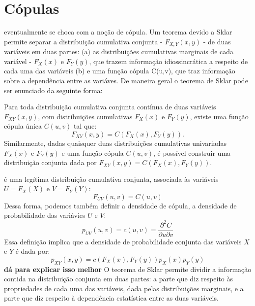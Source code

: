\section{Cópulas}
 eventualmente se choca com a noção de cópula\cite{Nelsen2006}. Um teorema devido a Sklar\cite{Sklar1959} permite separar a distribuição cumulativa conjunta - $F_{X,Y}(x,y)$ - de duas variáveis em duas partes: (a) as distribuições cumulativas marginais de cada variável - $F_{X}(x)$ e $F_{Y}(y)$, que trazem informação idiossincrática a respeito de cada uma das variáveis (b) e uma função cópula C(u,v), que traz informação sobre a dependência entre as variáves. De maneira geral o teorema de Sklar pode ser enunciado da seguinte forma:
\begin{Teorema}
Para toda distribuição cumulativa conjunta contínua de duas variáveis $F_{XY}(x,y)$, com distribuições cumulativas $F_X(x)$ e $F_Y(y)$, existe uma função cópula única $C(u,v)$ tal que:
\begin{equation}
 F_{XY}(x,y) = C(F_{X}(x), F_{Y}(y)).
\end{equation}
Similarmente, dadas quaisquer duas distribuições cumulativas univariadas $F_X(x)$ e $F_Y(y)$ e uma função cópula $C(u,v)$, é possível construir uma distribuição conjunta dada por $F_{XY}(x,y) = C(F_X(x),F_Y(y))$.
\end{Teorema}

 é uma legítima distribuição cumulativa conjunta, associada às variáveis $U = F_{X}(X)$ e $V = F_{Y}(Y)$:
\begin{equation*}
 F_{UV}(u,v) = C(u,v)
\end{equation*}
Dessa forma, podemos também definir a densidade de cópula, a densidade de probabilidade das variávies $U$ e $V$:
\begin{equation*}
 p_{UV}(u,v) = c(u,v) = \frac{\partial^2 C}{\partial u \partial v}
\end{equation*}
Essa definição implica que a densidade de probabilidade conjunta das variáveis $X$ e $Y$ é dada por:
\begin{equation}
\label{eq:density}
 p_{XY}(x,y) = c(F_X(x), F_Y(y)) p_X(x) p_Y(y)
\end{equation}
\textbf{dá para explicar isso melhor}
O teorema de Sklar permite dividir a informação contida na distribuição conjunta em duas partes: a parte que diz respeito às propriedades de cada uma das variáveis, dada pelas distribuições marginais, e a parte que diz respeito à dependência estatística entre as duas variáveis.

